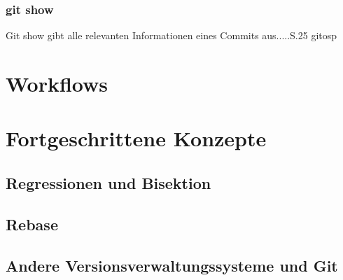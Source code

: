 \subsubsection{git show}\label{sec:gitshow}
Git show gibt alle relevanten Informationen eines Commits aus.....S.25 gitosp

\section{Workflows}
\label{sec:Workflows}
\section{Fortgeschrittene Konzepte}
\label{sec:FortgeschritteneKonzepte}
\subsection{Regressionen und Bisektion}\label{sec:bisec}
\subsection{Rebase}\label{sec:rebase}
\subsection{Andere Versionsverwaltungssysteme und Git}
\label{sec:AndereVersionsverwaltungssystemeundGit}

